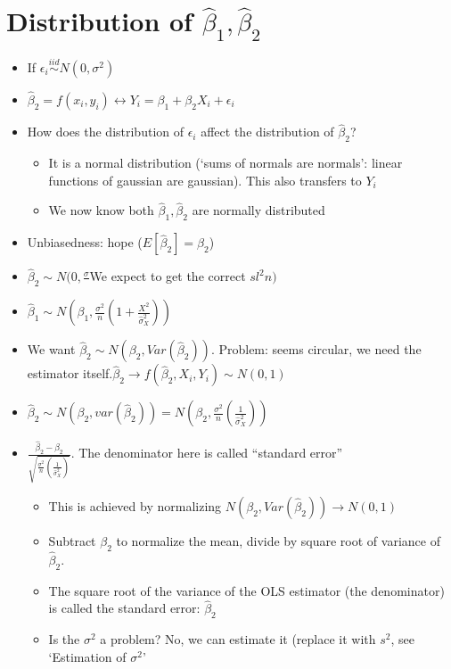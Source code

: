 \documentclass[10pt, oneside]{article}
\begin{document}
\section{Distribution of $\hat \beta_1, \hat \beta_2$}
\begin{itemize}
    \item If $\epsilon_i \overset{iid}{\sim} N (0, \sigma^2)$
    \item $\hat \beta_ 2 = f(x_i, y_i) \leftrightarrow Y_i = \beta_1 + \beta_2X_i + \epsilon_i$
    \item How does the distribution of $\epsilon_i$ affect the distribution of $\hat \beta_2$?
    \begin{itemize}
        \item It is a normal distribution (`sums of normals are normals': linear functions of gaussian are gaussian). This also transfers to $Y_i$
        \item We now know both $\hat \beta_1,\hat \beta_2$ are normally distributed
    \end{itemize}
    \item Unbiasedness: hope ($E[\hat \beta_2 ] = \beta_2$)
    \item $\hat \beta_2 \sim N(0, \frac{\sigma}{}$We expect to get the correct $sl^2{n})$
    \item $\hat \beta_1 \sim N(\beta_1, \frac{\sigma^2}{n}(1 + \frac{X^2}{\hat \sigma ^2 _X}))$
    \item We want $\hat \beta_2 \sim N(\beta_2, Var(\hat \beta_2))$. Problem: seems circular, we need the estimator itself.$\hat \beta_2 \rightarrow f(\hat \beta_2, X_i, Y_i ) \sim N(0,1)$
    \item $\hat \beta_2 \sim N(\beta_2, var(\hat \beta_2)) = N(\beta_2, \frac{\sigma^2}{n} (\frac{1}{\hat \sigma^2 _X}))$
    \item $\frac{\hat \beta_2 - \beta_2}{\sqrt{\frac{\sigma^2}{n} (\frac{1}{\hat \sigma^2_X})}}$. The denominator here is called ``standard error''
    \begin{itemize}
        \item This is achieved by normalizing $N(\beta_2, Var(\hat \beta_2)) \rightarrow N(0,1)$
        \item Subtract $\beta_2$ to normalize the mean, divide by square root of variance of $\hat \beta_2$. 
        \item The square root of the variance of the OLS estimator (the denominator) is called the standard error: $\hat \beta_2$
        \item Is the $\sigma^2$ a problem? No, we can estimate it (replace it with $s^2$, see `Estimation of $\sigma^2$'

\end{itemize}
\end{itemize}
\end{document}
